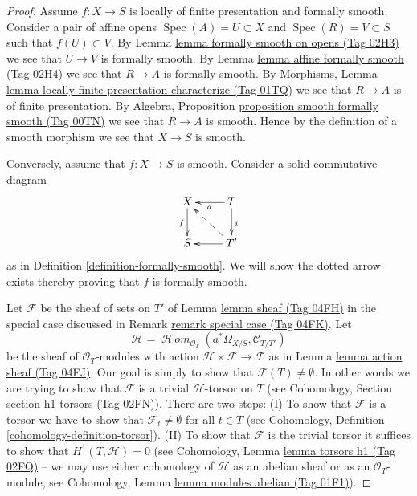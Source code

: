 \documentclass{amsart}
\theoremstyle{plain}
\theoremstyle{definition}
\theoremstyle{remark}
\numberwithin{equation}{subsection}
\def\Spec{\mathop{\mathrm{Spec}}}
\def\SheafHom{\mathop{\mathcal{H}\!\mathit{om}}\nolimits}
\begin{document}
\begin{proof}
Assume $f : X \to S$ is locally of finite presentation and formally smooth.
Consider a pair of affine opens $\Spec(A) = U \subset X$ and
$\Spec(R) = V \subset S$
such that $f(U) \subset V$. By Lemma \href{https://stacks.math.columbia.edu/tag/02H3}{lemma formally smooth on opens (Tag 02H3)}
we see that $U \to V$ is formally smooth. By Lemma
\href{https://stacks.math.columbia.edu/tag/02H4}{lemma affine formally smooth (Tag 02H4)} we see that $R \to A$ is formally
smooth. By
Morphisms, Lemma \href{https://stacks.math.columbia.edu/tag/01TQ}{lemma locally finite presentation characterize (Tag 01TQ)}
we see that $R \to A$ is of finite presentation.
By Algebra, Proposition \href{https://stacks.math.columbia.edu/tag/00TN}{proposition smooth formally smooth (Tag 00TN)}
we see that $R \to A$ is smooth.
Hence by the definition of a smooth morphism we see that $X \to S$ is smooth.

\medskip\noindent
Conversely, assume that $f : X \to S$ is smooth. Consider a solid commutative
diagram
$$
\xymatrix{
X \ar[d]_f & T \ar[d]^i \ar[l]^a \\
S & T' \ar[l] \ar@{-->}[lu]
}
$$
as in Definition \ref{definition-formally-smooth}.
We will show the dotted arrow exists thereby
proving that $f$ is formally smooth.

\medskip\noindent
Let $\mathcal{F}$ be the sheaf of sets on $T'$ of Lemma \href{https://stacks.math.columbia.edu/tag/04FH}{lemma sheaf (Tag 04FH)}
in the special case discussed in Remark \href{https://stacks.math.columbia.edu/tag/04FK}{remark special case (Tag 04FK)}.
Let
$$
\mathcal{H} =
\SheafHom_{\mathcal{O}_T}(a^*\Omega_{X/S}, \mathcal{C}_{T/T'})
$$
be the sheaf of $\mathcal{O}_T$-modules with action
$\mathcal{H} \times \mathcal{F} \to \mathcal{F}$ as in
Lemma \href{https://stacks.math.columbia.edu/tag/04FJ}{lemma action sheaf (Tag 04FJ)}. Our goal is simply
to show that $\mathcal{F}(T) \not = \emptyset$. In other words we
are trying to show that $\mathcal{F}$ is a trivial $\mathcal{H}$-torsor
on $T$ (see Cohomology, Section \href{https://stacks.math.columbia.edu/tag/02FN}{section h1 torsors (Tag 02FN)}).
There are two steps: (I) To show that $\mathcal{F}$ is a torsor
we have to show that $\mathcal{F}_t \not = \emptyset$ for all $t \in T$ (see
Cohomology, Definition \ref{cohomology-definition-torsor}).
(II) To show that $\mathcal{F}$ is the trivial torsor it suffices
to show that $H^1(T, \mathcal{H}) = 0$ (see
Cohomology, Lemma \href{https://stacks.math.columbia.edu/tag/02FQ}{lemma torsors h1 (Tag 02FQ)} --
we may use either cohomology
of $\mathcal{H}$ as an abelian sheaf or as an $\mathcal{O}_T$-module,
see Cohomology, Lemma \href{https://stacks.math.columbia.edu/tag/01F1}{lemma modules abelian (Tag 01F1)}).


\end{proof}
\end{document}
